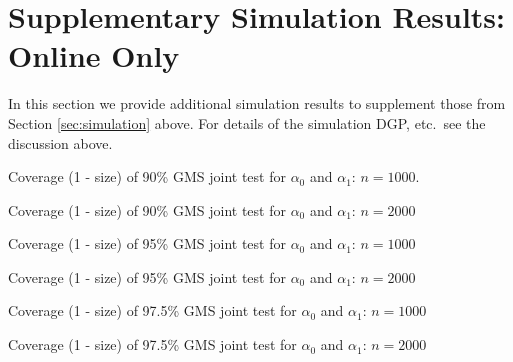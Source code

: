\section{Supplementary Simulation Results: Online Only}
\label{sec:simulation_supplement}

In this section we provide additional simulation results to supplement those from Section \ref{sec:simulation} above.
For details of the simulation DGP, etc.\ see the discussion above.


\begin{table}[htbp]
  \small
  \centering
  
  \caption{Coverage (1 - size) of 90\% GMS joint test for $\alpha_0$ and $\alpha_1$: $n = 1000$.} 
\end{table}


\begin{table}[htbp]
  \small
  \centering
  
  \caption{Coverage (1 - size) of 90\% GMS joint test for $\alpha_0$ and $\alpha_1$: $n = 2000$}
\end{table}
\begin{table}[htbp]
  \small
  \centering
  
  \caption{Coverage (1 - size) of 95\% GMS joint test for $\alpha_0$ and $\alpha_1$: $n = 1000$}
\end{table}


\begin{table}[htbp]
  \small
  \centering
  
  \caption{Coverage (1 - size) of 95\% GMS joint test for $\alpha_0$ and $\alpha_1$: $n = 2000$}
\end{table}
\begin{table}[htbp]
  \small
  \centering
  
  \caption{Coverage (1 - size) of 97.5\% GMS joint test for $\alpha_0$ and $\alpha_1$: $n = 1000$}
\end{table}


\begin{table}[htbp]
  \small
  \centering
  
  \caption{Coverage (1 - size) of 97.5\% GMS joint test for $\alpha_0$ and $\alpha_1$: $n = 2000$}
\end{table}

